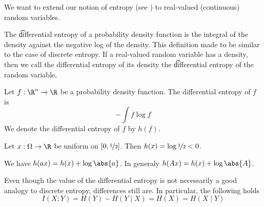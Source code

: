 

We want to extend our notion of entropy (see ) to real-valued (continuous) random variables.


The \t{differential entropy} of a probability density function is the integral of the density against the negative log of the density.
This definition made to be similar to the case of discrete entropy. 
If a real-valued random variable has a density, then we call the differential entropy of its density the \t{differential entropy} of the random variable.


Let $f: \R^n \to \R$ be a probability density function.
The differential entropy of $f$ is
\[
  - \int f \log f
\]
We denote the differential entropy of $f$ by $h(f)$.


Let $x: \Omega \to \R$ be uniform on $[0, \nicefrac{1}{2}]$.
Then $h(x) = \log\nicefrac{1}{2} < 0$.


We have $h(ax) = h(x) + \log\abs{a}$.
In generaly $h(Ax) = h(x) + \log\abs{A}$.


Even though the value of the differential entropy is not necessarily a good analogy to discrete entropy, differences still are.
In particular, the following holds
\[
  I(X; Y) = H(Y) - H(Y \mid X) = H(X) = H(X \mid Y)
\]

\blankpage
